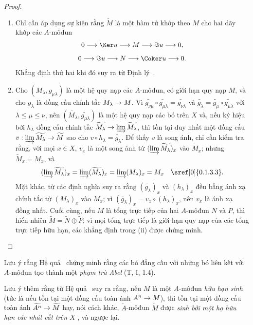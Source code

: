 \documentclass[oneside]{amsart}
\makeatletter
\renewcommand{\leq}{\leqslant}
\newcommand{\ega@arrow}[2]{\mathchoice{#1}{#2}{#2}{#2}}
\renewcommand{\to}{\ega@arrow{\longrightarrow}{\rightarrow}}
\newcommand{\oldpage}[2][]{{\marginnote{\normalfont\textbf{#1}~|~#2}}\ignorespaces}
\makeatother
\begin{document}
\begin{proof}
\medskip\noindent
\begin{enumerate}
  \item[(i)] Chỉ cần áp dụng sự kiện rằng $\widetilde{M}$ là một hàm tử khớp theo $M$  cho hai dãy khớp các $A$-môđun
    \[
      0\to\Ker u\to M\to\Im u\to 0,
    \]
    \[
      0\to\Im u\to N\to\Coker u\to 0.
    \]
    Khẳng định thứ hai khi đó suy ra từ Định lý~.
  \item[(ii)] Cho $(M_\lambda,g_{\mu\lambda})$ là một hệ quy nạp các $A$-môđun, có giới hạn quy nạp $M$, và cho $g_\lambda$ là đồng cấu chính tắc $M_\lambda\to M$.
    Vì $\widetilde{g_{\nu\mu}}\circ\widetilde{g_{\mu\lambda}}=\widetilde{g_{\nu\lambda}}$ và $\widetilde{g_\lambda}=\widetilde{g_\mu}\circ\widetilde{g_{\mu\lambda}}$ với $\lambda\leq\mu\leq\nu$, nên $(\widetilde{M_\lambda},\widetilde{g_{\mu\lambda}})$ là một hệ quy nạp các bó trên $X$ và, nếu ký hiệu bởi $h_\lambda$ đồng cấu chính tắc $\widetilde{M_\lambda}\to\varinjlim\widetilde{M_\lambda}$, thì tồn tại duy nhất một đồng cấu $v:\varinjlim\widetilde{M_\lambda}\to\widetilde{M}$ sao cho $v\circ h_\lambda=\widetilde{g_\lambda}$.
    Để thấy $v$ là song ánh, chỉ cần kiểm tra rằng, với mọi $x\in X$, $v_x$ là một song ánh từ $(\varinjlim\widetilde{M_\lambda})_x$ vào $\widetilde{M}_x$;
    nhưng $\widetilde{M}_x=M_x$, và
    \[
      (\varinjlim\widetilde{M_\lambda})_x=\varinjlim(\widetilde{M_\lambda})_x
      =\varinjlim(M_\lambda)_x=M_x\quad\sref[0]{0.1.3.3}.
    \]
    Mặt khác, từ các định nghĩa suy ra rằng $(\widetilde{g_\lambda})_x$ và
    $(h_\lambda)_x$ đều bằng ánh xạ chính tắc từ $(M_\lambda)_x$ vào $M_x$;
    vì $(\widetilde{g_\lambda})_x=v_x\circ(h_\lambda)_x$, nên $v_x$ là ánh xạ đồng nhất.
\oldpage[I]{88}
    Cuối cùng, nếu $M$ là tổng trực tiếp của hai $A$-môđun $N$ và $P$, thì hiển nhiên $\widetilde{M}=\widetilde{N}\oplus\widetilde{P}$;
    vì mọi tổng trực tiếp là giới hạn quy nạp của các tổng trực tiếp hữu hạn, các khẳng định trong (ii) được chứng minh.
\end{enumerate}
\end{proof}

Lưu ý rằng Hệ quả~ chứng minh rằng các bó đẳng cấu với những bó liên kết với $A$-môđun tạo thành một \emph{phạm trù Abel} (T, I, 1.4).

Lưu ý thêm rằng từ Hệ quả~ suy ra rằng, nếu $M$ là một $A$-môđun \emph{hữu hạn sinh} (tức là nếu tồn tại một đồng cấu toàn ánh $A^n\to M$), thì tồn tại một đồng cấu toàn ánh $\widetilde{A^n}\to\widetilde{M}$ hay, nói cách khác, $\widetilde{A}$-môđun $\widetilde{M}$ được \emph{sinh bởi một họ hữu hạn các nhát cắt trên $X$} , và ngược lại.
\end{document}
